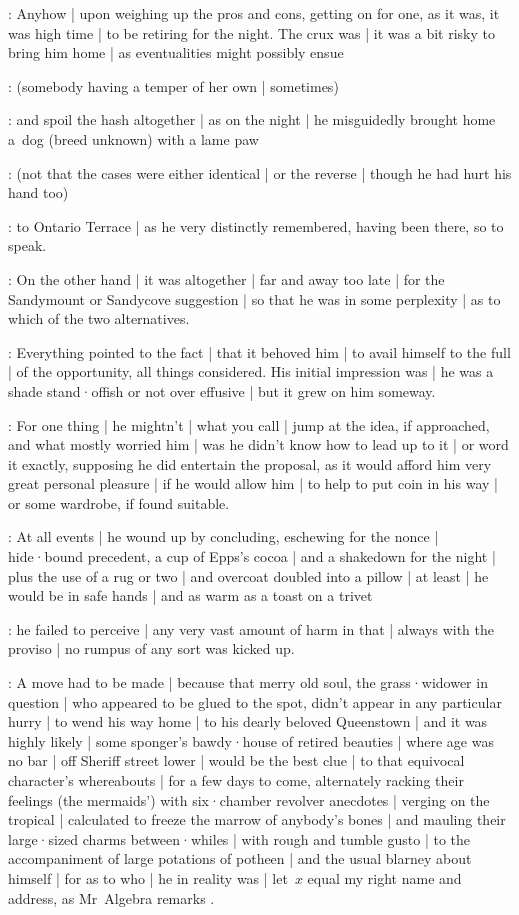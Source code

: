 :
Anyhow |
upon weighing up the pros and cons,
getting on for one,
as it was,
it was high time |
to be retiring for the night.
The crux was |
it was a bit risky to bring him home |
as eventualities might possibly ensue

:
(somebody having a temper of her own |
sometimes)

:
and spoil the hash altogether |
as on the night |
he misguidedly brought home a~dog
(breed unknown)
with a lame paw

:
(not that the cases were either identical |
or the reverse |
though he had hurt his hand too)

:
to Ontario Terrace |
as he very distinctly remembered,
having been there,
so to speak.%

:
On the other hand |
it was altogether |
far and away too late |
for the Sandymount or Sandycove suggestion |
so that he was in some perplexity |
as to which of the two alternatives.

:
Everything pointed to the fact |
that it behoved him |
to avail himself to the full |
of the opportunity,
all things considered.
His initial impression was |
he was a shade stand·offish or not over effusive |
but it grew on him someway.

:
For one thing |
he mightn't |
what you call |
jump at the idea,
if approached,
and what mostly worried him |
was he didn't know how to lead up to it |
or word it exactly,
supposing he did entertain the proposal,
as it would afford him very great personal pleasure |
if he would allow him |
to help to put coin in his way |
or some wardrobe,
if found suitable.%

:
At all events |
he wound up by concluding,
eschewing for the nonce |
hide·bound precedent,
a cup of Epps's cocoa |
and a shakedown for the night |
plus the use of a rug or two |
and overcoat doubled into a pillow |
at least |
he would be in safe hands |
and as warm as a toast on a trivet

:
he failed to perceive |
any very vast amount of harm in that |
always with the proviso |
no rumpus of any sort was kicked up.

:
A move had to be made |
because that merry old soul,
the grass·widower in question |
who appeared to be glued to the spot,
didn't appear in any particular hurry |
to wend his way home |
to his dearly beloved Queenstown |
and it was highly likely |
some sponger's bawdy·house of retired beauties |
where age was no bar |
off Sheriff street lower |
would be the best clue |
to that equivocal character's whereabouts |
for a few days to come,
alternately racking their feelings
(the mermaids')
with six·chamber revolver anecdotes |
verging on the tropical |
calculated to freeze the marrow of anybody's bones |
and mauling their large·sized charms between·whiles |
with rough and tumble gusto |
to the accompaniment of large potations of potheen |
and the usual blarney about himself |
for as to who |
he in reality was |
let~$x$ equal my right name and address,
as Mr~Algebra remarks .

